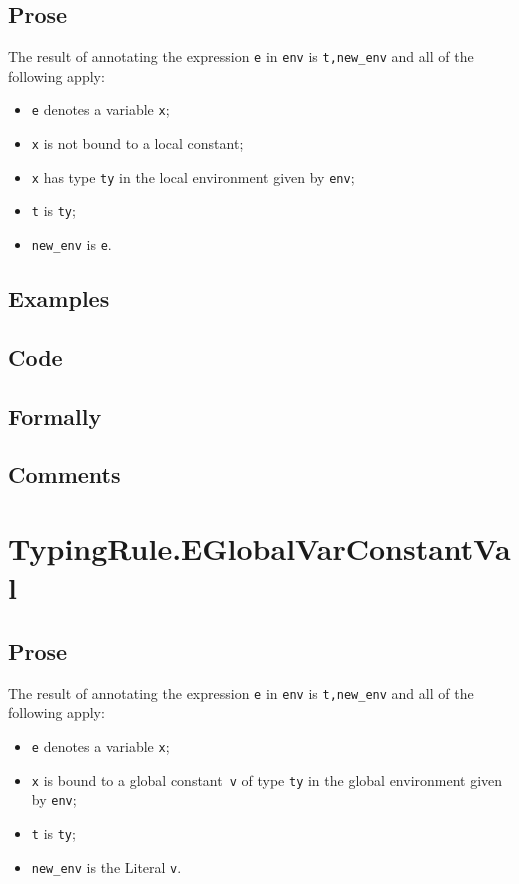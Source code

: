 \documentclass{book}
\begin{document}
  \subsection{Prose}
  The result of annotating the expression \texttt{e} in \texttt{env} is
\texttt{t,new\_env} and all of the following apply: 
  \begin{itemize}
  \item \texttt{e} denotes a variable \texttt{x};
  \item \texttt{x} is not bound to a local constant; 
  \item \texttt{x} has type \texttt{ty} in the local environment given by \texttt{env};
  \item \texttt{t} is \texttt{ty};
  \item \texttt{new\_env} is \texttt{e}.
  \end{itemize}

  \subsection{Examples}

  \subsection{Code}

  \subsection{Formally}

  \subsection{Comments}

\section{TypingRule.EGlobalVarConstantVal \label{sec:TypingRule.EGlobalVarConstant}}

  \subsection{Prose}
  The result of annotating the expression \texttt{e} in \texttt{env} is
\texttt{t,new\_env} and all of the following apply: 
  \begin{itemize}
  \item \texttt{e} denotes a variable \texttt{x};
  \item \texttt{x} is bound to a global constant~\texttt{v} of type \texttt{ty} in the global environment given by \texttt{env};
  \item \texttt{t} is \texttt{ty};
  \item \texttt{new\_env} is the Literal \texttt{v}.
  \end{itemize}
\end{document}
